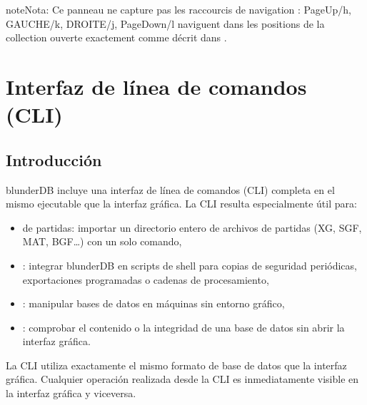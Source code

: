 \documentclass[letterpaper,10pt,spanish]{sphinxmanual}
\begin{document}
\begin{sphinxadmonition}{note}{Nota:}
\sphinxAtStartPar
Ce panneau ne capture pas les raccourcis de navigation :
PageUp/h, GAUCHE/k, DROITE/j, PageDown/l naviguent dans les positions de
la collection ouverte exactement comme décrit dans
{\hyperref[\detokenize{raccourcis:raccourcis-navigation}]{}}.
\end{sphinxadmonition}

\sphinxstepscope


\section{Interfaz de línea de comandos (CLI)}
\label{\detokenize{cli:interface-en-ligne-de-commande-cli}}\label{\detokenize{cli:cli}}\label{\detokenize{cli::doc}}

\subsection{Introducción}
\label{\detokenize{cli:introduction}}
\sphinxAtStartPar
blunderDB incluye una interfaz de línea de comandos (CLI) completa en el mismo ejecutable que la interfaz gráfica. La CLI resulta especialmente útil para:
\begin{itemize}
\item {} 
\sphinxAtStartPar
{} de partidas: importar un directorio entero de archivos de partidas (XG, SGF, MAT, BGF…) con un solo comando,

\item {} 
\sphinxAtStartPar
{}: integrar blunderDB en scripts de shell para copias de seguridad periódicas, exportaciones programadas o cadenas de procesamiento,

\item {} 
\sphinxAtStartPar
{}: manipular bases de datos en máquinas sin entorno gráfico,

\item {} 
\sphinxAtStartPar
{}: comprobar el contenido o la integridad de una base de datos sin abrir la interfaz gráfica.

\end{itemize}

\sphinxAtStartPar
La CLI utiliza exactamente el mismo formato de base de datos que la interfaz gráfica. Cualquier operación realizada desde la CLI es inmediatamente visible en la interfaz gráfica y viceversa.
\end{document}
